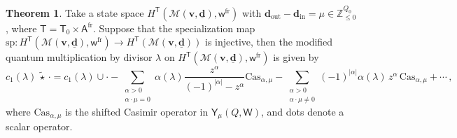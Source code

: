 \documentclass[10pt]{amsart}
\theoremstyle{definition}
\newtheorem{Theorem}{Theorem}[section]
\numberwithin{equation}{section}
\newcommand{\bZ}{\mathbb{Z}}
\newcommand{\bv}{\mathbf{v}}
\newcommand{\bd}{\mathbf{d}}
\newcommand{\cM}{\mathcal{M}}
\newcommand{\sA}{\mathsf{A}}
\newcommand{\sT}{\mathsf{T}}
\newcommand{\sW}{\mathsf{W}}
\newcommand{\sw}{\mathsf{w}}
\newcommand{\In}{\operatorname{in}}
\newcommand{\Out}{\operatorname{out}}
\begin{document}
\begin{Theorem}\label{thm qm div for asym_sp inj}
Take a state space $H^{\sT}(\cM(\bv,\underline{\bd}),\sw^{\mathrm{fr}})$ with $\bd_{\Out}-\bd_{\In}=\mu\in \bZ_{\leqslant 0}^{Q_0}$, where $\sT=\sT_0\times \sA^{\mathrm{fr}}$. Suppose that the specialization map $\mathrm{sp}\colon H^\sT(\cM(\bv,\underline{\bd}),\sw^{\mathrm{fr}})\to H^\sT(\cM(\bv,\underline{\bd}))$ is injective, then the modified quantum multiplication by divisor $\lambda$ on $H^{\sT}(\cM(\bv,\underline{\bd}),\sw^{\mathrm{fr}})$ is given by
$$c_1(\lambda)\,\widetilde{\star}\,\cdot =c_1(\lambda)\cup \cdot -\sum_{\substack{\alpha>0\\ \alpha\cdot \mu=0}}\alpha(\lambda)\frac{z^\alpha}{(-1)^{|\alpha|}-z^\alpha}\mathrm{Cas}_{\alpha,\mu}-\sum_{\substack{\alpha>0\\ \alpha\cdot \mu\neq 0}}(-1)^{|\alpha|}\alpha(\lambda)\,z^\alpha\,\mathrm{Cas}_{\alpha,\mu}+\cdots \,,$$
where $\mathrm{Cas}_{\alpha,\mu}$ is the shifted Casimir operator in $\mathsf Y_{\mu}(Q,\sW)$, and dots denote a scalar operator.
\end{Theorem}
\end{document}
